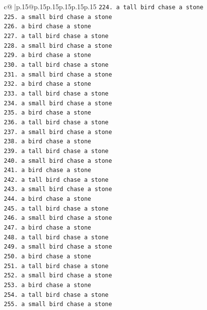 \documentclass{article}
\begin{document}
{\begin{supertabular}{c@{$\;$}|p{.15\linewidth}@{}p{.15\linewidth}p{.15\linewidth}p{.15\linewidth}p{.15\linewidth}p{.15\linewidth}}
{{{\texttt{224. a tall bird chase a stone} \\
\texttt{225. a small bird chase a stone} \\
\texttt{226. a bird chase a stone} \\
\texttt{227. a tall bird chase a stone} \\
\texttt{228. a small bird chase a stone} \\
\texttt{229. a bird chase a stone} \\
\texttt{230. a tall bird chase a stone} \\
\texttt{231. a small bird chase a stone} \\
\texttt{232. a bird chase a stone} \\
\texttt{233. a tall bird chase a stone} \\
\texttt{234. a small bird chase a stone} \\
\texttt{235. a bird chase a stone} \\
\texttt{236. a tall bird chase a stone} \\
\texttt{237. a small bird chase a stone} \\
\texttt{238. a bird chase a stone} \\
\texttt{239. a tall bird chase a stone} \\
\texttt{240. a small bird chase a stone} \\
\texttt{241. a bird chase a stone} \\
\texttt{242. a tall bird chase a stone} \\
\texttt{243. a small bird chase a stone} \\
\texttt{244. a bird chase a stone} \\
\texttt{245. a tall bird chase a stone} \\
\texttt{246. a small bird chase a stone} \\
\texttt{247. a bird chase a stone} \\
\texttt{248. a tall bird chase a stone} \\
\texttt{249. a small bird chase a stone} \\
\texttt{250. a bird chase a stone} \\
\texttt{251. a tall bird chase a stone} \\
\texttt{252. a small bird chase a stone} \\
\texttt{253. a bird chase a stone} \\
\texttt{254. a tall bird chase a stone} \\
\texttt{255. a small bird chase a stone} \\
}}}
\end{supertabular}}
\end{document}

